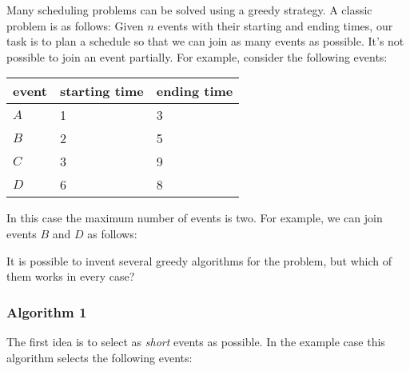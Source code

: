 Many scheduling problems can be solved
using a greedy strategy.
A classic problem is as follows:
Given $n$ events with their starting and ending
times, our task is to plan a schedule
so that we can join as many events as possible.
It's not possible to join an event partially.
For example, consider the following events:
\begin{center}
\begin{tabular}{lll}
event & starting time & ending time \\
\hline
$A$ & 1 & 3 \\
$B$ & 2 & 5 \\
$C$ & 3 & 9 \\
$D$ & 6 & 8 \\
\end{tabular}
\end{center}
In this case the maximum number of events is two.
For example, we can join events $B$ and $D$
as follows:
\begin{center}
\end{center}

It is possible to invent several greedy algorithms
for the problem, but which of them works in every case?

\subsubsection*{Algorithm 1}

The first idea is to select as \emph{short}
events as possible.
In the example case this algorithm
selects the following events:
\begin{center}
\end{center}

